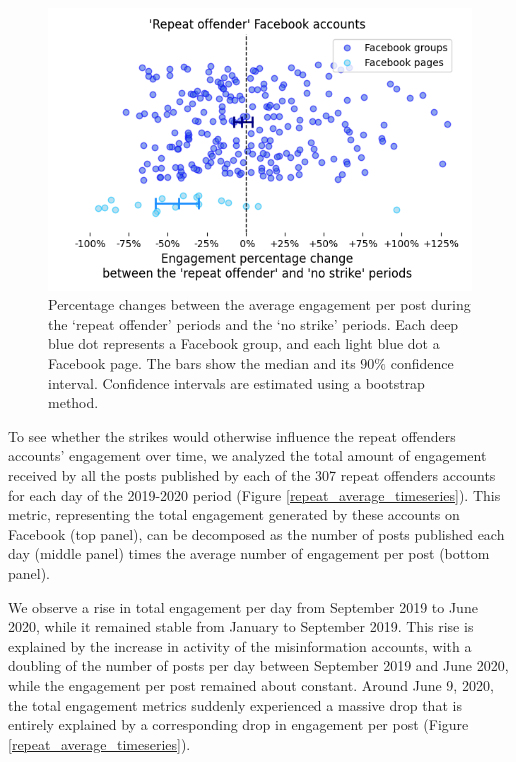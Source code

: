 \documentclass[11pt,a4paper]{article}
\begin{document}
\begin{figure}[!h]
\centering
\includegraphics[width=\linewidth]{./../figure/repeat_vs_free_percentage_change.png}
\caption{Percentage changes between the average engagement per post during the `repeat offender' periods and the `no strike' periods. 
Each deep blue dot represents a Facebook group, and each light blue dot a Facebook page.
The bars show the median and its $90\%$ confidence interval.
Confidence intervals are estimated using a bootstrap method.}
\label{repeat_vs_free_percentage_change}
\end{figure}

To see whether the strikes would otherwise influence the repeat offenders accounts' engagement over time, we analyzed the total amount of engagement received by all the posts published by each of the 307 repeat offenders accounts for each day of the 2019-2020 period (Figure \ref{repeat_average_timeseries}). 
This metric, representing the total engagement generated by these accounts on Facebook (top panel), can be decomposed as the number of posts published each day (middle panel) times the average number of engagement per post (bottom panel).

We observe a rise in total engagement per day from September 2019 to June 2020, while it remained stable from January to September 2019. 
This rise is explained by the increase in activity of the misinformation accounts, with a doubling of the number of posts per day between September 2019 and June 2020, while the engagement per post remained about constant.
Around June 9, 2020, the total engagement metrics suddenly experienced a massive drop that is entirely explained by a corresponding drop in engagement per post (Figure \ref{repeat_average_timeseries}).
\end{document}
